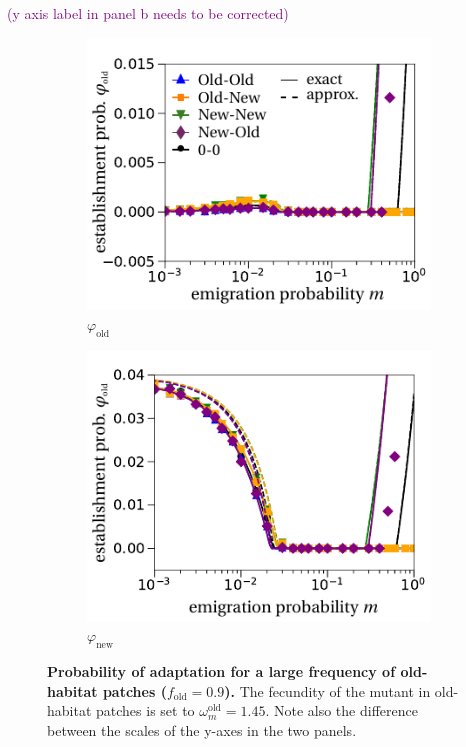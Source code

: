 \documentclass[11pt]{article}
\newcommand{\florence}[1]{\textcolor{purple}{(#1)}} %
\begin{document}
\florence{y axis label in panel b needs to be corrected}
\begin{figure}[h!]
	\centering
	\begin{subfigure}{.5\textwidth}
		\centering
		\includegraphics[width=\linewidth]{figS5a.pdf}
		\caption{$\varphi_{\text{old}}$}
	\end{subfigure}%
	\begin{subfigure}{.5\textwidth}
		\centering
		\includegraphics[width=\linewidth]{figS5b.pdf}
		\caption{$\varphi_{\text{new}}$}
	\end{subfigure}
	\caption{\textbf{Probability of adaptation for a large frequency of old-habitat patches ($f_{\text{old}}=0.9$).} The fecundity of the mutant in old-habitat patches is set to $\omega^\text{old}_m=1.45$. Note also the difference between the scales of the y-axes in the two panels.}
	\label{Sfig:vary_f}
\end{figure}
\end{document}
